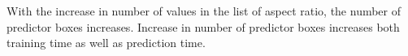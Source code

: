 


With the increase in number of values in the list of aspect ratio, the number of predictor boxes increases. Increase in number of predictor boxes increases both training time as well as prediction time.
